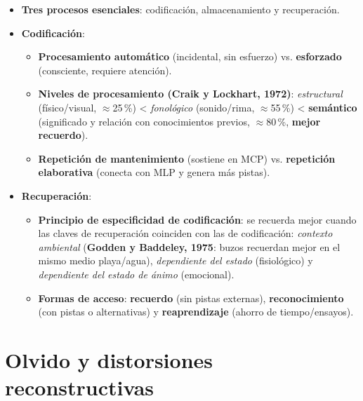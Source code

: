 \documentclass[11pt,a4paper]{article}
\begin{document}
\begin{itemize}
  \item \textbf{Tres procesos esenciales}: codificación, almacenamiento y recuperación.
  \item \textbf{Codificación}:
  \begin{itemize}
    \item \textbf{Procesamiento automático} (incidental, sin esfuerzo) vs. \textbf{esforzado} (consciente, requiere atención).
    \item \textbf{Niveles de procesamiento (Craik y Lockhart, 1972)}: \textit{estructural} (físico/visual, $\approx$25\,\%) < \textit{fonológico} (sonido/rima, $\approx$55\,\%) < \textbf{semántico} (significado y relación con conocimientos previos, $\approx$80\,\%, \textbf{mejor recuerdo}).
    \item \textbf{Repetición de mantenimiento} (sostiene en MCP) vs. \textbf{repetición elaborativa} (conecta con MLP y genera más pistas).
  \end{itemize}
  \item \textbf{Recuperación}:
  \begin{itemize}
    \item \textbf{Principio de especificidad de codificación}: se recuerda mejor cuando las claves de recuperación coinciden con las de codificación: \textit{contexto ambiental} (\textbf{Godden y Baddeley, 1975}: buzos recuerdan mejor en el mismo medio playa/agua), \textit{dependiente del estado} (fisiológico) y \textit{dependiente del estado de ánimo} (emocional).
    \item \textbf{Formas de acceso}: \textbf{recuerdo} (sin pistas externas), \textbf{reconocimiento} (con pistas o alternativas) y \textbf{reaprendizaje} (ahorro de tiempo/ensayos).
  \end{itemize}
\end{itemize}

\section{Olvido y distorsiones reconstructivas}
\end{document}
